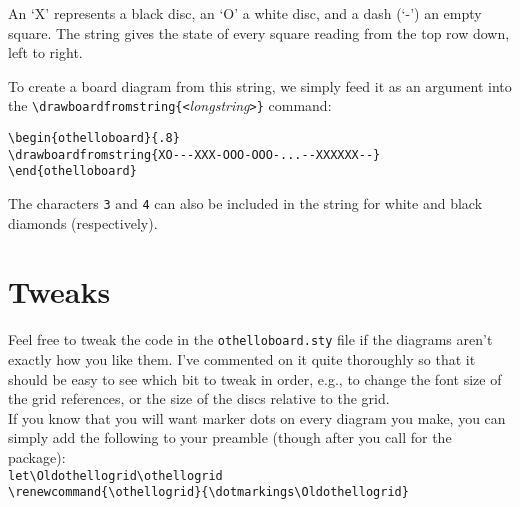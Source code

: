 \documentclass[a4paper,12pt]{article}
\begin{document}
An `X' represents a black disc, an `O' a white disc, and a dash (`-') an empty square. The string gives the state of every square reading from the top row down, left to right. 

To create a board diagram from this string, we simply feed it as an argument into the \verb=\drawboardfromstring{<=\emph{longstring}\verb=>}= command:
\begin{center}
\begin{minipage}[c]{144pt}
\vspace{0pt}
\begin{othelloboard}{.8}
\end{othelloboard}
\end{minipage}
\hfill
\begin{minipage}[c]{272pt}
\begin{footnotesize}
\begin{verbatim}
\begin{othelloboard}{.8}
\drawboardfromstring{XO---XXX-OOO-OOO-...--XXXXXX--}
\end{othelloboard}
\end{verbatim}
\end{footnotesize}
\end{minipage}
\end{center}

The characters \verb=3= and \verb=4= can also be included in the string for white and black diamonds (respectively).

\section{Tweaks}
Feel free to tweak the code in the \verb=othelloboard.sty= file if the diagrams aren't exactly how you like them. I've commented on it quite thoroughly so that it should be easy to see which bit to tweak in order, e.g., to change the font size of the grid references, or the size of the discs relative to the grid.\\

If you know that you will want marker dots on every diagram you make, you can simply add the following to your preamble (though after you call for the package):\\

\noindent \verb=let\Oldothellogrid\othellogrid= \\
\verb=\renewcommand{\othellogrid}{\dotmarkings\Oldothellogrid}= \\
  
\end{document}
